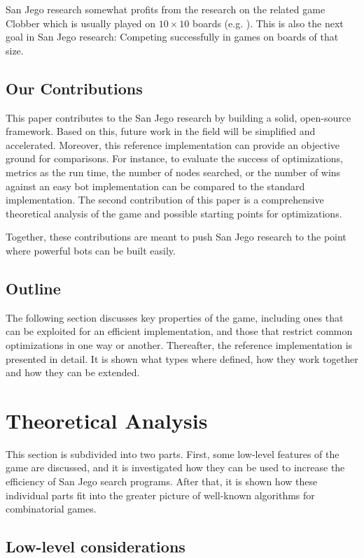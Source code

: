 \documentclass[sigconf]{acmart}
\begin{document}
San Jego research somewhat profits from the research on the related game Clobber which is usually played on $10\times10$ boards (e.g. \cite{Althöfer2004}).
This is also the next goal in San Jego research:
Competing successfully in games on boards of that size.

\subsection{Our Contributions}
This paper contributes to the San Jego research by building a solid, open-source framework.
Based on this, future work in the field will be simplified and accelerated.
Moreover, this reference implementation can provide an objective ground for comparisons.
For instance, to evaluate the success of optimizations, metrics as the run time, the number of nodes searched, or the number of wins against an easy bot implementation can be compared to the standard implementation.
The second contribution of this paper is a comprehensive theoretical analysis of the game and possible starting points for optimizations.

Together, these contributions are meant to push San Jego research to the point where powerful bots can be built easily.

\subsection{Outline}
The following section discusses key properties of the game, including ones that can be exploited for an efficient implementation, and those that restrict common optimizations in one way or another.
Thereafter, the reference implementation is presented in detail.
It is shown what types where defined, how they work together and how they can be extended.

\section{Theoretical Analysis}
This section is subdivided into two parts.
First, some low-level features of the game are discussed, and it is investigated how they can be used to increase the efficiency of San Jego search programs.
After that, it is shown how these individual parts fit into the greater picture of well-known algorithms for combinatorial games.

\subsection{Low-level considerations}\label{subsec:low-level}
\end{document}
